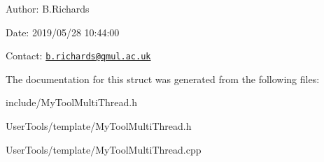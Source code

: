 \begin{DoxyParagraph}{Author\-:}
B.\-Richards 
\end{DoxyParagraph}
\begin{DoxyParagraph}{Date\-:}
2019/05/28 10\-:44\-:00 
\end{DoxyParagraph}
Contact\-: \href{mailto:b.richards@qmul.ac.uk}{\tt b.\-richards@qmul.\-ac.\-uk} 

The documentation for this struct was generated from the following files\-:\begin{DoxyCompactItemize}
\item 
include/My\-Tool\-Multi\-Thread.\-h\item 
User\-Tools/template/My\-Tool\-Multi\-Thread.\-h\item 
User\-Tools/template/My\-Tool\-Multi\-Thread.\-cpp\end{DoxyCompactItemize}
